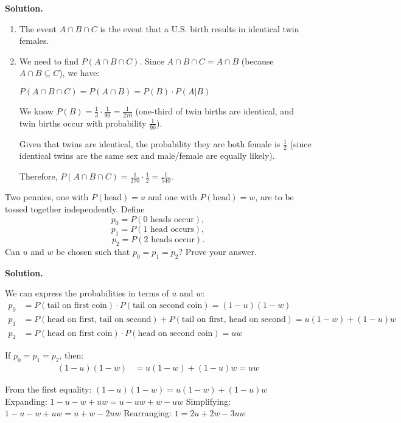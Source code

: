 \noindent\textbf{Solution.}
\begin{enumerate}[label=(\alph*)]
    \item The event $A \cap B \cap C$ is the event that a U.S. birth results in identical twin females.
    
    \item We need to find $P(A \cap B \cap C)$. Since $A \cap B \cap C = A \cap B$ (because $A \cap B \subseteq C$), we have:
    
    $P(A \cap B \cap C) = P(A \cap B) = P(B) \cdot P(A|B)$
    
    We know $P(B) = \frac{1}{3} \cdot \frac{1}{90} = \frac{1}{270}$ (one-third of twin births are identical, and twin births occur with probability $\frac{1}{90}$).
    
    Given that twins are identical, the probability they are both female is $\frac{1}{2}$ (since identical twins are the same sex and male/female are equally likely).
    
    Therefore, $P(A \cap B \cap C) = \frac{1}{270} \cdot \frac{1}{2} = \frac{1}{540}$.
\end{enumerate}


\begin{problembox}
Two pennies, one with $P(\text{head})=u$ and one with $P(\text{head})=w$, are to be tossed together independently. Define
\[ p_0 = P(0 \text{ heads occur}), \]
\[ p_1 = P(1 \text{ head occurs}), \]
\[ p_2 = P(2 \text{ heads occur}). \]
Can $u$ and $w$ be chosen such that $p_0 = p_1 = p_2$? Prove your answer.
\end{problembox}

\noindent\textbf{Solution.}

We can express the probabilities in terms of $u$ and $w$:
\begin{align*}
p_0 &= P(\text{tail on first coin}) \cdot P(\text{tail on second coin}) = (1-u)(1-w) \\
p_1 &= P(\text{head on first, tail on second}) + P(\text{tail on first, head on second}) = u(1-w) + (1-u)w \\
p_2 &= P(\text{head on first coin}) \cdot P(\text{head on second coin}) = uw
\end{align*}

If $p_0 = p_1 = p_2$, then:
\begin{align*}
(1-u)(1-w) &= u(1-w) + (1-u)w = uw
\end{align*}

From the first equality: $(1-u)(1-w) = u(1-w) + (1-u)w$
Expanding: $1 - u - w + uw = u - uw + w - uw$
Simplifying: $1 - u - w + uw = u + w - 2uw$
Rearranging: $1 = 2u + 2w - 3uw$

